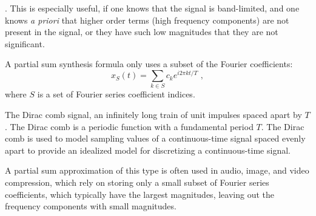 .
This is especially useful, if one knows that the signal is band-limited,
and one knows \emph{a priori} that higher order terms (high frequency components)
are not present in the signal, or they have such low magnitudes that they are not significant.

A partial sum synthesis formula only uses a subset of the Fourier coefficients:
\begin{equation}
  x_S(t) = \sum_{k \in S} c_k e^{i 2\pi kt/T} \,\,,
\end{equation}
where $S$ is a set of Fourier series coefficient indices.

\begin{marginfigure}
  \begin{center}
  \end{center}
  \caption{The Dirac comb signal, an infinitely long train of unit impulses spaced apart by $T$. The Dirac comb is a periodic function with a fundamental period $T$.
    The Dirac comb is used to model sampling values of a continuous-time signal spaced evenly apart to provide an idealized model for discretizing a continuous-time signal.}
  \label{fig:dirac_comb_plot2}
\end{marginfigure}

A partial sum approximation of this type is often used in audio, image, and video compression,
which rely on storing only a small subset of Fourier series coefficients, which typically have
the largest magnitudes, leaving out the frequency components with small magnitudes.

